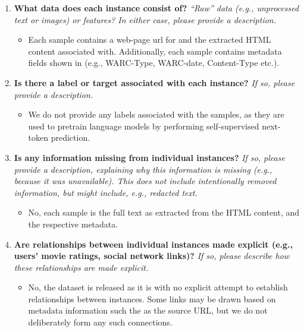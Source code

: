 \documentclass{article}
\begin{document}
\begin{enumerate}[label=Q\arabic*, resume]
\item \textbf{What data does each instance consist of?} \textit{“Raw” data (e.g., unprocessed text or images) or features? In either case, please provide a description.}

\begin{itemize}
\item Each sample contains a web-page url for and the extracted HTML content associated with. Additionally, each sample contains metadata fields shown in  (e.g., WARC-Type, WARC-date, Content-Type etc.).
\end{itemize}

\item \textbf{Is there a label or target associated with each instance?} \textit{If so, please provide a description.}

\begin{itemize}
\item We do not provide any labels associated with the samples, as they are used to pretrain language models by performing self-supervised next-token prediction.
\end{itemize}

\item \textbf{Is any information missing from individual instances?} \textit{If so, please provide a description, explaining why this information is missing (e.g., because it was unavailable). This does not include intentionally removed information, but might include, e.g., redacted text.}

\begin{itemize}
\item No, each sample is the full text as extracted from the HTML content, and the respective metadata.
\end{itemize}

\item \textbf{Are relationships between individual instances made explicit (e.g., users' movie ratings, social network links)?} \textit{If so, please describe how these relationships are made explicit.}

\begin{itemize}
\item No, the dataset is released as it is with no explicit attempt to establish relationships between instances. Some links may be drawn based on metadata information such the as the source URL, but we do not deliberately form any such connections.
\end{itemize}


\end{enumerate}
\end{document}
